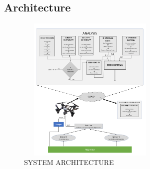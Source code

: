 \documentclass[conference]{IEEEtran}
\begin{document}
\subsection{Architecture}

\begin{figure}[htp]
    \centering
    \includegraphics[width=7cm,height=7cm]{architecture_ml.png}
    \caption{SYSTEM ARCHITECTURE}
    \label{sa}
\end{figure}
\end{document}
